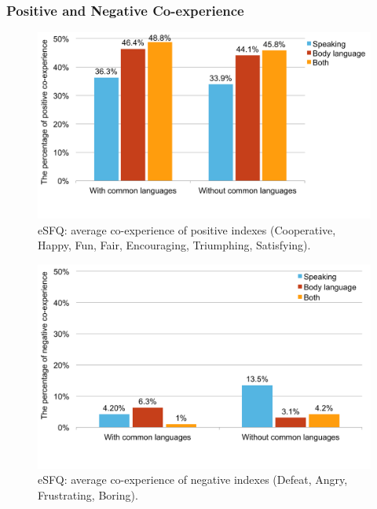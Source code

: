 



\subsubsection{Positive and Negative Co-experience}

\begin{figure}[!h]
\centering
\includegraphics[width=0.8\columnwidth]{Figures/US_eSFQ_Pos_Average.pdf}
\caption{eSFQ: average co-experience of positive indexes (Cooperative, Happy, Fun, Fair, Encouraging, Triumphing, Satisfying).}
\label{fig:US_eSFQ_Pos_Average}
\end{figure}

\begin{figure}[!h]
\centering
\includegraphics[width=0.8\columnwidth]{Figures/US_eSFQ_Neg_Average.pdf}
\caption{eSFQ: average co-experience of negative indexes (Defeat, Angry, Frustrating, Boring).}
\label{fig:US_eSFQ_Neg_Average}
\end{figure}

